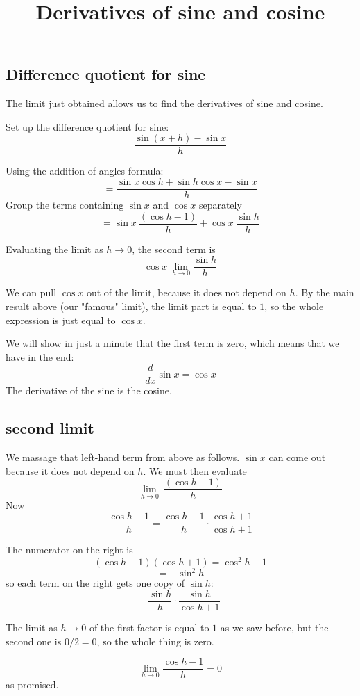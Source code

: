 \documentclass[11pt, oneside]{article}
\title{Derivatives of sine and cosine}
\date{}
\begin{document}
\maketitle
\Large


\subsection*{Difference quotient for sine}
The limit just obtained allows us to find the derivatives of sine and cosine.  

Set up the difference quotient for sine:
\[  \frac{\sin (x + h) - \sin x}{h} \]

Using the addition of angles formula:
\[ = \frac{\sin x \cos h + \sin h \cos x - \sin x}{h} \]
Group the terms containing $\sin x$ and $\cos x$ separately
\[ = \sin x \ \frac{(\cos h - 1)}{h} + \cos x \ \frac{\sin h}{h} \]

Evaluating the limit as $h \rightarrow 0$, the second term is
\[ \cos x \ \lim_{h \rightarrow 0} \frac{\sin h}{h} \]

We can pull $\cos x$ out of the limit, because it does not depend on $h$.  By the main result above (our "famous" limit), the limit part is equal to $1$, so the whole expression is just equal to $\cos x$.

We will show in just a minute that the first term is zero, which means that we have in the end:
\[ \frac{d}{dx} \sin x = \cos x \]
The derivative of the sine is the cosine.

\subsection*{second limit}

We massage that left-hand term from above as follows.  $\sin x$ can come out because it does not depend on $h$.  We must then evaluate
\[ \lim_{h \rightarrow 0} \ \frac{(\cos h - 1)}{h} \]
Now
\[ \frac{\cos h - 1}{h}  =  \frac{\cos h - 1}{h}  \cdot \frac{\cos h + 1}{\cos h + 1} \]

The numerator on the right is
\[ (\cos h - 1)(\cos h + 1) = \cos^2 h - 1 \]
\[ = -\sin^2 h \]
so each term on the right gets one copy of $\sin h$:
\[  - \frac{\sin h}{h} \cdot \frac{\sin h}{\cos h + 1} \]

The limit as $h \rightarrow 0$ of the first factor is equal to $1$ as we saw before, but the second one is $0/2 = 0$, so the whole thing is zero.

\[ \lim_{h \rightarrow 0} \frac{\cos h - 1}{h} = 0 \]
as promised.
\end{document}
